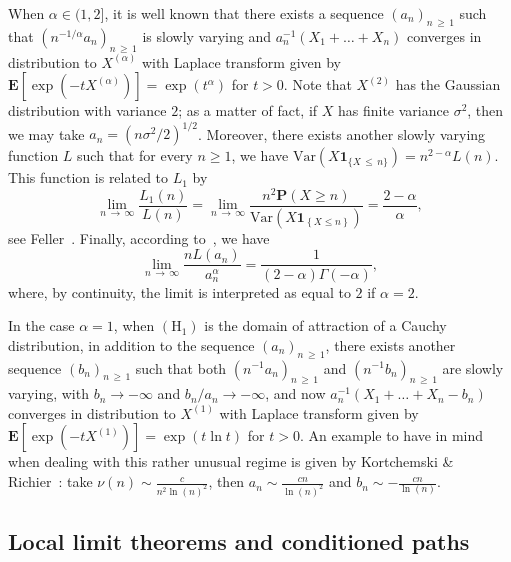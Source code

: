 \documentclass[AHL,Unicode,longabstracts,published]{cedram}
\newcommand{\ensembles}[1]{\mathbf{#1}}
\renewcommand{\P}{\ensembles{P}}
\newcommand{\E}{\ensembles{E}}
\newcommand{\1}{\ensembles{1}}
\newcommand{\ind}[1]{\1_{\{#1\}}}
\renewcommand{\le}{\leqslant}
\renewcommand{\ge}{\geqslant}
\newcommand{\Xmap}{X}
\newcommand{\Var}{\mathrm{Var}}
\newcommand{\Hrm}{\mathrm{H}}
\begin{document}
When $\alpha \in (1,2]$, it is well known that there exists a sequence $(a_n)_{n\,\ge\,1}$ such that $(n^{-1/\alpha} a_n)_{n\,\ge\,1}$ is slowly varying and $a_n^{-1} (X_1 + \dots + X_n)$ converges in distribution to $\Xmap^{(\alpha)}$ with Laplace transform given by $\E[\exp(- t \Xmap^{(\alpha)})] = \exp(t^\alpha)$ for $t > 0$. Note that $\Xmap^{(2)}$ has the Gaussian distribution with variance $2$; as a matter of fact, if $X$ has finite variance $\sigma^2$, then we may take $a_n = (n \sigma^2 / 2)^{1/2}$. Moreover, there exists another slowly varying function $L$ such that for every $n \ge 1$, we have $\Var(X \ind{X\,\le\,n}) = n^{2-\alpha} L(n)$. This function is related to $L_1$ by
\begin{equation}\label{eq:ratio_fonctions_var_lente}
\lim_{n\,\to\,\infty} \frac{L_1(n)}{L(n)} = \lim_{n\,\to\, \infty} \frac{n^2 \P(X \ge n)}{\Var\left(X \1_{\left\{X \le n\right\}}\right)} = \frac{2-\alpha}{\alpha},
\end{equation}
see Feller~\cite[Chapter~XVII, Equation~5.16]{Fel71}. Finally, according to~\cite[Equation~7]{Kor17}, we have
\begin{equation}\label{eq:constante_Levy}
\lim_{n\,\to\,\infty} \frac{n L(a_n)}{a_n^\alpha} = \frac{1}{(2-\alpha) \Gamma(-\alpha)},
\end{equation}
where, by continuity, the limit is interpreted as equal to $2$ if $\alpha=2$.

In the case $\alpha=1$, when $(\Hrm_1)$ is the domain of attraction of a Cauchy distribution, in addition to the sequence $(a_n)_{n\,\ge\,1}$, there exists another sequence $(b_n)_{n\,\ge\,1}$ such that both $(n^{-1} a_n)_{n\,\ge\,1}$ and $(n^{-1} b_n)_{n\,\ge\,1}$ are slowly varying, with $b_n \to -\infty$ and $b_n / a_n \to -\infty$, and now $a_n^{-1} (X_1 + \dots + X_n - b_n)$ converges in distribution to $\Xmap^{(1)}$ with Laplace transform given by $\E[\exp(- t \Xmap^{(1)})] = \exp(t \ln t)$ for $t > 0$. An example to have in mind when dealing with this rather unusual regime is given by Kortchemski \& Richier~\cite{KR19}: take $\nu(n) \sim \tfrac{c}{n^2 \ln(n)^2}$, then $a_n \sim \tfrac{c n}{\ln(n)^2}$ and $b_n \sim - \tfrac{c n}{\ln(n)}$.



\subsection{Local limit theorems and conditioned paths}\label{sec:Luka_stable}
\end{document}
